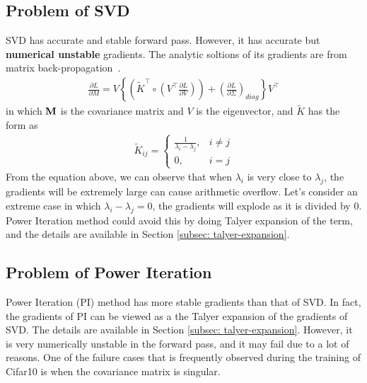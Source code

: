 \subsection{Problem of SVD}
SVD has accurate and stable forward pass. However, it has accurate but \textbf{numerical unstable} gradients.
The analytic soltions of its gradients are from matrix back-propagation~\cite{ionescu2015matrix}.
	\begin{equation}
	\begin{aligned}
	\frac{\partial L}{\partial M}=V\left\{\left(\widetilde{K}^{\top} \circ\left(V^{\top} \frac{\partial L}{\partial V}\right)\right)+\left(\frac{\partial L}{\partial \Sigma}\right)_{d i a g}\right\} V^{\top}
	\end{aligned}
	\label{eq: mb}
	\end{equation}
in which $\mathbf{M}$ is the covariance matrix and $V$ is the eigenvector, and $\widetilde{K}$ has the form as
\begin{equation}
	\begin{aligned}
	\widetilde{K}_{i j}=\left\{\begin{array}{ll}{\frac{1}{\lambda_{i}-\lambda_{j}},} & {i \neq j} \\ {0,} & {i=j}\end{array}\right.
	\end{aligned}
	\label{eq: mb_k}
	\end{equation}
From the equation above, we can observe that when $\lambda_{i}$ is very close to $\lambda_{j}$, the gradients will be extremely large can cause arithmetic overflow.
Let's consider an extreme case in which $\lambda_{i}-\lambda_{j}=0$, the gradients will explode as it is divided by 0. Power Iteration method could avoid this by doing Talyer expansion of the term, and the details are available in Section \ref{subsec: talyer-expansion}.

\subsection{Problem of Power Iteration}

Power Iteration (PI) method has more stable gradients than that of SVD. In fact, the gradients of PI can be viewed as a the Talyer expansion of the gradients of SVD. The details are available in Section \ref{subsec: talyer-expansion}. However, it is very numerically unstable in the forward pass, and it may fail due to a lot of reasons. 
One of the failure cases that is frequently observed during the training of Cifar10 is when the covariance matrix is singular. 

